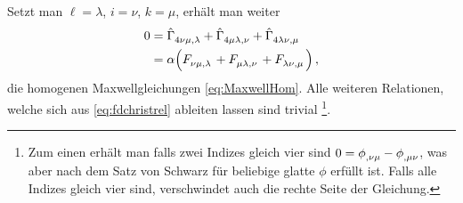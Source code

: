 Setzt man $\ell = \lambda$, $i=\nu$, $k = \mu$, erhält man weiter 
\begin{equation}
\begin{split}
0&=\tensor*{\hat{\Gamma}}{_4_\nu_\mu_{,\lambda}}
+\tensor*{\hat{\Gamma}}{_4_\mu_\lambda_{,\nu}}
+\tensor*{\hat{\Gamma}}{_4_\lambda_\nu_{,\mu}}\\
&=\alpha\left(\tensor{F}{_\nu_\mu_{,\lambda}}
+\tensor{F}{_\mu_\lambda_{,\nu}}
+\tensor{F}{_\lambda_\nu_{,\mu}}\right)\,,
\end{split}
\end{equation}
die homogenen Maxwellgleichungen \eqref{eq:MaxwellHom}. Alle weiteren
Relationen, welche sich aus \eqref{eq:fdchristrel} ableiten lassen sind
trivial
\footnote{Zum einen erhält man falls zwei Indizes gleich vier sind
$0=\tensor{\phi}{_{,\nu\mu}}-\tensor{\phi}{_{,\mu\nu}}$, was aber nach dem
Satz von Schwarz für beliebige glatte $\phi$ erfüllt ist. Falls alle
Indizes gleich vier sind, verschwindet auch die rechte Seite der Gleichung.}.

